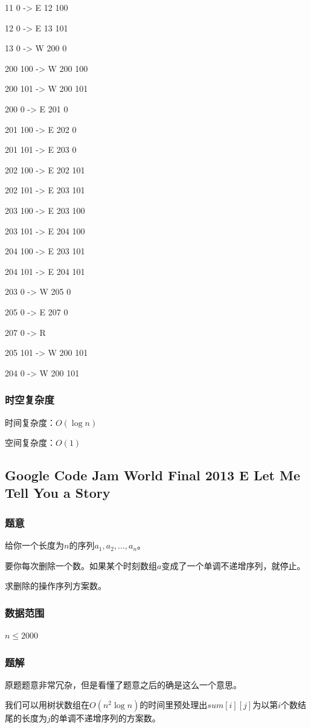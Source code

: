 \documentclass{ctexart}
\begin{document}
11 0 -> E 12 100

12 0 -> E 13 101

13 0 -> W 200 0

200 100 -> W 200 100

200 101 -> W 200 101

200 0 -> E 201 0

201 100 -> E 202 0

201 101 -> E 203 0

202 100 -> E 202 101

202 101 -> E 203 101

203 100 -> E 203 100

203 101 -> E 204 100

204 100 -> E 203 101

204 101 -> E 204 101

203 0 -> W 205 0

205 0 -> E 207 0

207 0 -> R

205 101 -> W 200 101

204 0 -> W 200 101

\subsubsection{时空复杂度}
时间复杂度：$O(\log n)$

空间复杂度：$O(1)$
\subsection{Google Code Jam World Final 2013 E Let Me Tell You a Story}
\subsubsection{题意}
给你一个长度为$n$的序列$a_1,a_2,\ldots,a_n$。

要你每次删除一个数。如果某个时刻数组$a$变成了一个单调不递增序列，就停止。

求删除的操作序列方案数。
\subsubsection{数据范围}
$n \le 2000$
\subsubsection{题解}
原题题意非常冗杂，但是看懂了题意之后的确是这么一个意思。

我们可以用树状数组在$O(n^2 \log n)$的时间里预处理出$sum[i][j]$为以第$i$个数结尾的长度为$j$的单调不递增序列的方案数。
\end{document}
